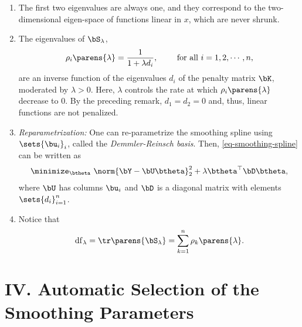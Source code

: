 \documentclass[12pt]{article}
\begin{document}
\begin{enumerate}[label=\textbf{\arabic*.}]
\begin{enumerate}
		\item The first two eigenvalues are always one, and they correspond to the two-dimensional eigen-space of functions linear in $x$, which are never shrunk. 
		
		\item The eigenvalues of $\bS_\lambda$, 
		\begin{align*}
			\rho_i \parens{\lambda} = \frac{1}{1 + \lambda d_i}, \qquad \text{ for all } i = 1, 2, \cdots, n, 
		\end{align*}
		are an inverse function of the eigenvalues $d_i$ of the penalty matrix $\bK$, moderated by $\lambda > 0$. Here, $\lambda$ controls the rate at which $\rho_i \parens{\lambda}$ decrease to 0. By the preceding remark, $d_1 = d_2 = 0$ and, thus, linear functions are not penalized. 
		
		\item \textit{Reparametrization:} One can re-parametrize the smoothing spline using $\sets{\bu_i}_{i}$, called the \textit{Demmler-Reinsch basis}. Then, \eqref{eq-smoothing-spline} can be written as 
		\begin{align*}
			\minimize_{\btheta} \ \norm{\bY - \bU \btheta}_2^2 + \lambda \btheta^\top \bD \btheta, 
		\end{align*}
		where $\bU$ has columns $\bu_i$ and $\bD$ is a diagonal matrix with elements $\sets{d_i}_{i=1}^n$. 
		
		\item Notice that 
		\begin{align*}
			\mathrm{df}_\lambda = \tr \parens{\bS_\lambda} = \sum_{k=1}^n \rho_k \parens{\lambda}. 
		\end{align*}
	\end{enumerate}
\end{enumerate}


\section*{IV. Automatic Selection of the Smoothing Parameters}
\end{document}

